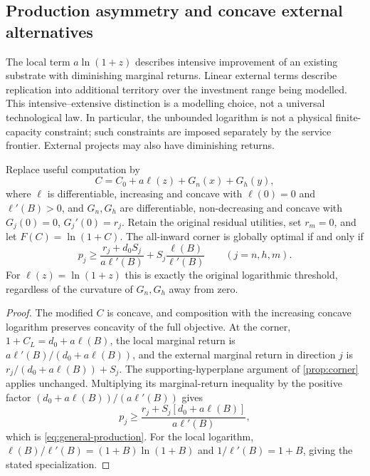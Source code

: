 \subsection{Production asymmetry and concave external alternatives}
\label{sec:production}
The local term $a\ln(1+z)$ describes intensive improvement of an existing
substrate with diminishing marginal returns. Linear external terms describe
replication into additional territory over the investment range being
modelled. This intensive--extensive distinction is a modelling choice,
not a universal technological law. In particular, the unbounded logarithm
is not a physical finite-capacity constraint; such constraints are imposed
separately by the service frontier. External projects may also have
diminishing returns.

\begin{lemma}
\label{lem:production}
Replace useful computation by
\[
 C=C_0+a\ell(z)+G_n(x)+G_h(y),
\]
where $\ell$ is differentiable, increasing and concave with $\ell(0)=0$
and $\ell'(B)>0$, and $G_n,G_h$ are differentiable, non-decreasing and
concave with $G_j(0)=0$, $G_j'(0)=r_j$. Retain the original residual
utilities, set $r_m=0$, and let $F(C)=\ln(1+C)$. The all-inward corner
is globally optimal if and only if
\begin{equation}
 p_j\geq\frac{r_j+d_0S_j}{a\ell'(B)}
            +S_j\frac{\ell(B)}{\ell'(B)}
 \qquad(j=n,h,m).
 \label{eq:general-production}
\end{equation}
For $\ell(z)=\ln(1+z)$ this is exactly the original logarithmic
threshold, regardless of the curvature of $G_n,G_h$ away from zero.
\end{lemma}
\begin{proof}
The modified $C$ is concave, and composition with the increasing concave
logarithm preserves concavity of the full objective. At the corner,
$1+C_L=d_0+a\ell(B)$, the local marginal return is
$a\ell'(B)/(d_0+a\ell(B))$, and the external marginal return in
direction $j$ is $r_j/(d_0+a\ell(B))+S_j$.
The supporting-hyperplane argument of \cref{prop:corner} applies unchanged.
Multiplying its marginal-return inequality by the positive factor
$(d_0+a\ell(B))/(a\ell'(B))$ gives
\[
 p_j\geq\frac{r_j+S_j[d_0+a\ell(B)]}{a\ell'(B)},
\]
which is \cref{eq:general-production}. For the local logarithm,
$\ell(B)/\ell'(B)=(1+B)\ln(1+B)$ and
$1/\ell'(B)=1+B$, giving the stated specialization.
\end{proof}

